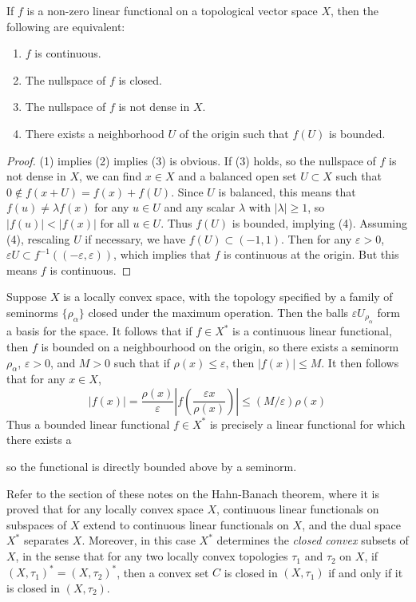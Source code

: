 \begin{theorem}
    If $f$ is a non-zero linear functional on a topological vector space $X$, then the following are equivalent:
    \begin{enumerate}
        \item $f$ is continuous.
        \item The nullspace of $f$ is closed.
        \item The nullspace of $f$ is not dense in $X$.
        \item There exists a neighborhood $U$ of the origin such that $f(U)$ is bounded.
    \end{enumerate}
\end{theorem}
\begin{proof}
    (1) implies (2) implies (3) is obvious. If (3) holds, so the nullspace of $f$ is not dense in $X$, we can find $x \in X$ and a balanced open set $U \subset X$ such that $0 \not \in f(x + U) = f(x) + f(U)$. Since $U$ is balanced, this means that $f(u) \neq \lambda f(x)$ for any $u \in U$ and any scalar $\lambda$ with $|\lambda| \geq 1$, so $|f(u)| < |f(x)|$ for all $u \in U$. Thus $f(U)$ is bounded, implying (4). Assuming (4), rescaling $U$ if necessary, we have $f(U) \subset (-1,1)$. Then for any $\varepsilon > 0$, $\varepsilon U \subset f^{-1}((-\varepsilon,\varepsilon))$, which implies that $f$ is continuous at the origin. But this means $f$ is continuous.
\end{proof}

\begin{example}
    Suppose $X$ is a locally convex space, with the topology specified by a family of seminorms $\{ \rho_\alpha \}$ closed under the maximum operation. Then the balls $\varepsilon U_{\rho_\alpha}$ form a basis for the space. It follows that if $f \in X^*$ is a continuous linear functional, then $f$ is bounded on a neighbourhood on the origin, so there exists a seminorm $\rho_\alpha$, $\varepsilon > 0$, and $M > 0$ such that if $\rho(x) \leq \varepsilon$, then $|f(x)| \leq M$. It then follows that for any $x \in X$,
    \[ |f(x)| = \frac{\rho(x)}{\varepsilon} \left| f \left( \frac{\varepsilon x}{\rho(x)} \right) \right| \leq (M/\varepsilon) \rho(x) \]
    Thus a bounded linear functional $f \in X^*$ is precisely a linear functional for which there exists a

    so the functional is directly bounded above by a seminorm.
\end{example}

Refer to the section of these notes on the Hahn-Banach theorem, where it is proved that for any locally convex space $X$, continuous linear functionals on subspaces of $X$ extend to continuous linear functionals on $X$, and the dual space $X^*$ separates $X$. Moreover, in this case $X^*$ determines the \emph{closed convex} subsets of $X$, in the sense that for any two locally convex topologies $\tau_1$ and $\tau_2$ on $X$, if $(X,\tau_1)^* = (X,\tau_2)^*$, then a convex set $C$ is closed in $(X,\tau_1)$ if and only if it is closed in $(X,\tau_2)$.

